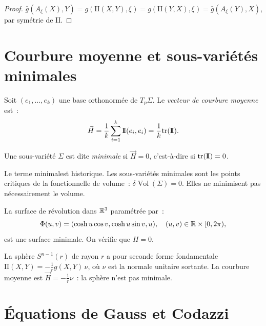 \begin{proof}
$\bar{g}(A_\xi(X), Y) = g(\mathrm{I\!I}(X, Y), \xi) = g(\mathrm{I\!I}(Y, X), \xi)
= \bar{g}(A_\xi(Y), X)$, par sym\'etrie de $\mathrm{I\!I}$.
\end{proof}

\section{Courbure moyenne et sous-vari\'et\'es minimales}

\begin{definition}
Soit $(e_1, \ldots, e_k)$ une base orthonorm\'ee de $T_p\Sigma$. Le \emph{vecteur
de courbure moyenne} est~:
\[
    \vec{H} = \frac{1}{k} \sum_{i=1}^{k} \mathrm{I\!I}(e_i, e_i)
    = \frac{1}{k} \mathrm{tr}(\mathrm{I\!I}).
\]
\end{definition}

\begin{definition}
Une sous-vari\'et\'e $\Sigma$ est dite \emph{minimale} si $\vec{H} = 0$, c'est-\`a-dire
si $\mathrm{tr}(\mathrm{I\!I}) = 0$.
\end{definition}

\begin{remarque}
Le terme \og{}minimal\fg est historique. Les sous-vari\'et\'es minimales sont les
points critiques de la fonctionnelle de volume~: $\delta \operatorname{Vol}(\Sigma) = 0$.
Elles ne minimisent pas n\'ecessairement le volume.
\end{remarque}

\begin{exemple}
La surface de r\'evolution dans $\mathbb{R}^3$ param\'etr\'ee par~:
\[
    \Phi(u, v) = (\cosh u \cos v, \cosh u \sin v, u), \quad (u, v) \in \mathbb{R} \times [0, 2\pi),
\]
est une surface minimale. On v\'erifie que $H = 0$.
\end{exemple}

\begin{exemple}
La sph\`ere $S^{n-1}(r)$ de rayon $r$ a pour seconde forme fondamentale
$\mathrm{I\!I}(X, Y) = -\frac{1}{r} g(X, Y)\, \nu$, o\`u $\nu$ est la normale
unitaire sortante. La courbure moyenne est $\vec{H} = -\frac{1}{r}\nu$~:
la sph\`ere n'est pas minimale.
\end{exemple}

\section{\'Equations de Gauss et Codazzi}

